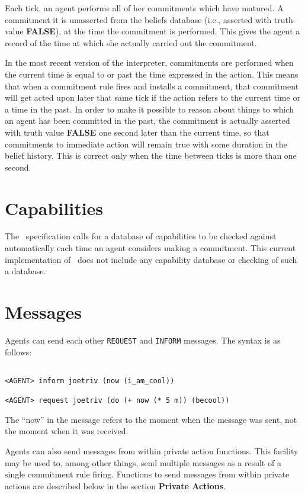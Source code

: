 Each tick, an agent performs all of her commitments which have
matured.  A commitment it is unasserted from the beliefs database
(i.e., asserted with truth-value {\bf FALSE}), at the time the
commitment is performed.  This gives the agent a record of the time at
which she actually carried out the commitment.

In the most recent version of the interpreter, commitments are
performed when the current time is equal to or past the time expressed
in the action.  This means that when a commitment rule fires and
installs a commitment, that commitment will get acted upon later that
same tick if the action refers to the current time or a time in the
past.  In order to make it possible to reason about things to which an
agent has been committed in the past, the commitment is actually
asserted with truth value {\bf FALSE} one second later than the
current time, so that commitments to immediate action will remain true
with some duration in the belief history.  This is correct only when
the time between ticks is more than one second.


\section{Capabilities}

The \ao\ specification calls for a database of capabilities to be
checked against automatically each time an agent considers making a
commitment.  This current implementation of \ao\ does not include any
capability database or checking of such a database.


\section{Messages}

Agents can send each other {\tt REQUEST} and {\tt INFORM} messages.
The syntax is as follows:

\begin{verbatim}

<AGENT> inform joetriv (now (i_am_cool))

<AGENT> request joetriv (do (+ now (* 5 m)) (becool))

\end{verbatim}

The ``now'' in the message refers to the moment when the message was
sent, not the moment when it was received.

Agents can also send messages from within private action functions.
This facility may be used to, among other things, send multiple
messages as a result of a single commitment rule firing.  Functions to
send messages from within private actions are described below in the
section {\bf Private Actions}.

